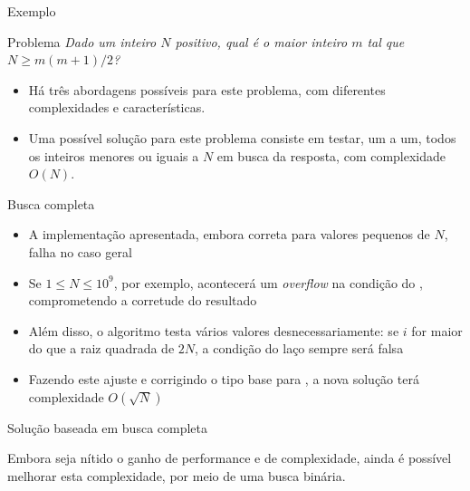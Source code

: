 \begin{frame}[fragile]{Exemplo}

    \begin{block}{Problema}
    \textit{Dado um inteiro $N$ positivo, qual é o maior inteiro $m$ tal que $N \geq m(m + 1)/2$?}
    \end{block}

    \begin{itemize}
        \item Há três abordagens possíveis para este problema, com diferentes complexidades e características.

        \item Uma possível solução para este problema consiste em testar, um a um, todos os inteiros menores ou iguais a $N$ em busca da resposta, com complexidade $O(N)$.
    \end{itemize}

\end{frame}

\begin{frame}[fragile]{Busca completa}

    \begin{itemize}
        \item A implementação apresentada, embora correta para valores pequenos de $N$, falha no caso geral

        \item Se $1 \leq N \leq 10^9$, por exemplo, acontecerá um \textit{overflow} na condição do , comprometendo a corretude do resultado

        \item Além disso, o algoritmo testa vários valores desnecessariamente: se $i$ for maior do que a raiz quadrada de $2N$, a condição do laço sempre será falsa

        \item Fazendo este ajuste e corrigindo o tipo base para , a nova solução terá complexidade $O(\sqrt{N})$
    \end{itemize}

\end{frame}

\begin{frame}[fragile]{Solução baseada em busca completa}


    \vspace{0.2in}

    Embora seja nítido o ganho de performance e de complexidade, ainda é possível melhorar esta complexidade, por meio de uma busca binária.
\end{frame}

